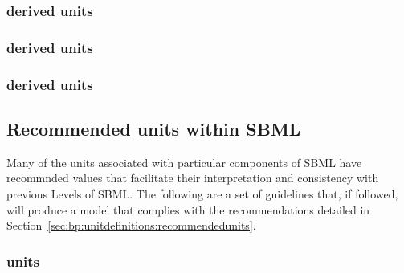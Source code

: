 \subsubsection*{ derived units} \begin{sbmlenum}


\end{sbmlenum} 

\subsubsection*{ derived units} \begin{sbmlenum}


\end{sbmlenum} 

\subsubsection*{ derived units} \begin{sbmlenum}


\end{sbmlenum}

\subsection{Recommended units within SBML}

Many of the units associated with particular components of SBML 
have recommnded values that facilitate their interpretation and 
consistency with previous Levels of SBML. The following are a set 
of guidelines that, if followed, will produce a model that complies
with the recommendations detailed in 
Section~\ref{sec:bp:unitdefinitions:recommendedunits}.

\subsubsection*{ units} \begin{sbmlenum}


\end{sbmlenum} 

